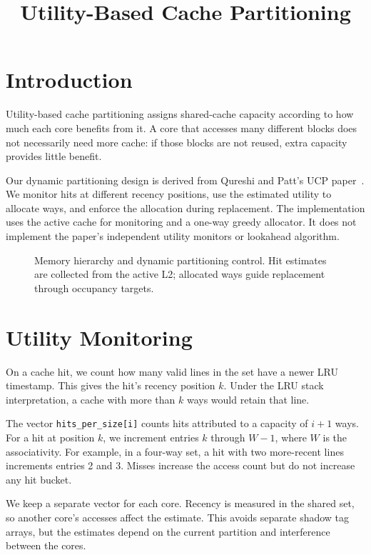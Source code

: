 \documentclass{article}
\title{Utility-Based Cache Partitioning}
\author{}
\date{}
\begin{document}
\maketitle


\section{Introduction}
Utility-based cache partitioning assigns shared-cache capacity according to how much each core benefits from it. A core that accesses many different blocks does not necessarily need more cache: if those blocks are not reused, extra capacity provides little benefit.

Our dynamic partitioning design is derived from Qureshi and Patt's UCP paper~\cite{ucp}. We monitor hits at different recency positions, use the estimated utility to allocate ways, and enforce the allocation during replacement. The implementation uses the active cache for monitoring and a one-way greedy allocator. It does not implement the paper's independent utility monitors or lookahead algorithm.


\begin{figure}[H]\centering

\caption{Memory hierarchy and dynamic partitioning control. Hit estimates are collected from the active L2; allocated ways guide replacement through occupancy targets.}\label{fig:architecture}
\end{figure}

\section{Utility Monitoring}
On a cache hit, we count how many valid lines in the set have a newer LRU timestamp. This gives the hit's recency position $k$. Under the LRU stack interpretation, a cache with more than $k$ ways would retain that line.

The vector \texttt{hits\_per\_size[i]} counts hits attributed to a capacity of $i+1$ ways. For a hit at position $k$, we increment entries $k$ through $W-1$, where $W$ is the associativity. For example, in a four-way set, a hit with two more-recent lines increments entries 2 and 3. Misses increase the access count but do not increase any hit bucket.

We keep a separate vector for each core. Recency is measured in the shared set, so another core's accesses affect the estimate. This avoids separate shadow tag arrays, but the estimates depend on the current partition and interference between the cores.
\end{document}
